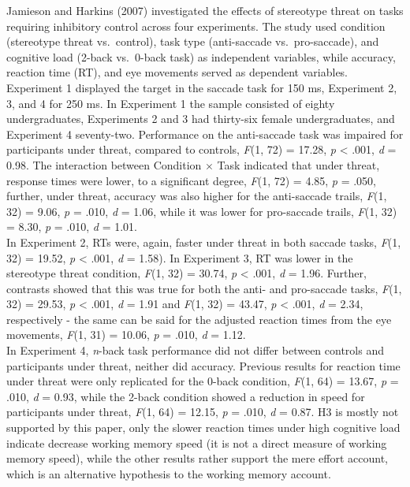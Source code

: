 \documentclass[
  stu, a4paper, 12pt,mask,floatsintext]{apa7}
\begin{document}
Jamieson and Harkins (2007) investigated the effects of stereotype threat on tasks requiring inhibitory control across four experiments.
The study used condition (stereotype threat vs.~control), task type (anti-saccade vs.~pro-saccade), and cognitive load (2-back vs.~0-back task) as independent variables, while accuracy, reaction time (RT), and eye movements served as dependent variables.
Experiment 1 displayed the target in the saccade task for 150 ms, Experiment 2, 3, and 4 for 250 ms.
In Experiment 1 the sample consisted of eighty undergraduates, Experiments 2 and 3 had thirty-six female undergraduates, and Experiment 4 seventy-two.
Performance on the anti-saccade task was impaired for participants under threat, compared to controls, \emph{F}(1, 72) = 17.28, \emph{p} \textless{} .001, \emph{d} = 0.98.
The interaction between Condition \(\times\) Task indicated that under threat, response times were lower, to a significant degree, \emph{F}(1, 72) = 4.85, \emph{p} = .050, further, under threat, accuracy was also higher for the anti-saccade trails, \emph{F}(1, 32) = 9.06, \emph{p} = .010, \emph{d} = 1.06, while it was lower for pro-saccade trails, \emph{F}(1, 32) = 8.30, \emph{p} = .010, \emph{d} = 1.01.\\
In Experiment 2, RTs were, again, faster under threat in both saccade tasks, \emph{F}(1, 32) = 19.52, \emph{p} \textless{} .001, \emph{d} = 1.58).
In Experiment 3, RT was lower in the stereotype threat condition, \emph{F}(1, 32) = 30.74, \emph{p} \textless{} .001, \emph{d} = 1.96.
Further, contrasts showed that this was true for both the anti- and pro-saccade tasks, \emph{F}(1, 32) = 29.53, \emph{p} \textless{} .001, \emph{d} = 1.91 and \emph{F}(1, 32) = 43.47, \emph{p} \textless{} .001, \emph{d} = 2.34, respectively - the same can be said for the adjusted reaction times from the eye movements, \emph{F}(1, 31) = 10.06, \emph{p} = .010, \emph{d} = 1.12.\\
In Experiment 4, \emph{n}-back task performance did not differ between controls and participants under threat, neither did accuracy.
Previous results for reaction time under threat were only replicated for the 0-back condition, \emph{F}(1, 64) = 13.67, \emph{p} = .010, \emph{d} = 0.93, while the 2-back condition showed a reduction in speed for participants under threat, \emph{F}(1, 64) = 12.15, \emph{p} = .010, \emph{d} = 0.87.
H3 is mostly not supported by this paper, only the slower reaction times under high cognitive load indicate decrease working memory speed (it is not a direct measure of working memory speed), while the other results rather support the mere effort account, which is an alternative hypothesis to the working memory account.
\end{document}
